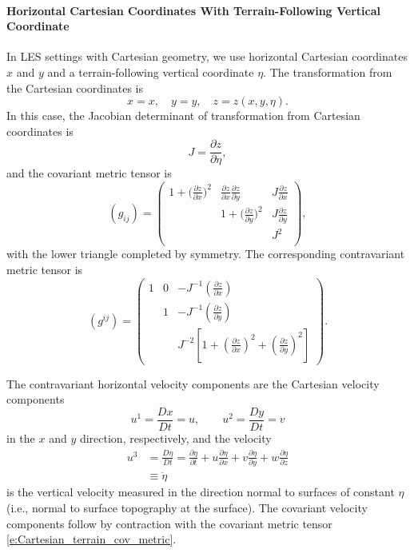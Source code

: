 \documentclass{report}
\begin{document}
\paragraph{Horizontal Cartesian Coordinates With Terrain-Following Vertical Coordinate} In LES settings with Cartesian geometry, we use horizontal Cartesian coordinates $x$ and $y$ and a terrain-following vertical coordinate $\eta$. 
The transformation from the Cartesian coordinates is
\[
x = x, \quad y = y, \quad z = z(x, y, \eta).
\]
In this case, the Jacobian determinant of transformation from Cartesian coordinates is 
\[
J = \frac{\partial z}{\partial\eta},
\]
and the covariant metric tensor is \citep{Guerra16a}
\begin{equation}\label{e:Cartesian_terrain_cov_metric}
    (g_{ij}) = \left(
    \begin{matrix}
    1 + \big(\frac{\partial z}{\partial x}\big)^{2} & 
    \frac{\partial z}{\partial x} \frac{\partial z}{\partial y} & 
    J \frac{\partial z}{\partial x}  \\
    & 
    1 + \big(\frac{\partial z}{\partial y}\big)^{2} 
    & J \frac{\partial z}{\partial y}  \\
     &
     & 
     J^2\\
    \end{matrix}
    \right),
\end{equation}
with the lower triangle completed by symmetry. The corresponding contravariant metric tensor is
\begin{equation}
    (g^{ij}) = \left(
    \begin{matrix}
    1 & 0 & - J^{-1} \left( \frac{\partial z}{\partial x} \right) \\
      & 1 & - J^{-1} \left( \frac{\partial z}{\partial y} \right) \\
      & & J^{-2} 
      \left[ 1 + \left( \frac{\partial z}{\partial x} \right)^2 + \left( \frac{\partial z}{\partial y} \right)^2 \right]
    \end{matrix}
    \right).
\end{equation}


The contravariant horizontal velocity components are the Cartesian velocity components 
\[
u^1 = \frac{Dx}{Dt} = u, \qquad u^2 = \frac{Dy}{Dt} = v
\]
in the $x$ and $y$ direction, respectively, and the velocity
\begin{align*}
u^3 & = \frac{D\eta}{Dt} 
 = \frac{\partial \eta}{\partial t} + u \frac{\partial \eta}{\partial x} + v \frac{\partial \eta}{\partial y} + w \frac{\partial \eta}{\partial z}\\
 & \equiv \dot \eta
\end{align*}
is the vertical velocity measured in the direction normal to surfaces of constant $\eta$ (i.e., normal to surface topography at the surface). The covariant velocity components follow by contraction with the covariant metric tensor \eqref{e:Cartesian_terrain_cov_metric}.
\end{document}
